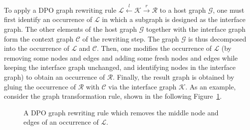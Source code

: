 To apply a DPO graph rewriting rule $\mathcal{L} \overset{l}{\leftarrow} \mathcal{K} \overset{r}{\rightarrow} \mathcal{R}$ to a host graph $\mathcal{G}$, one must first identify an occurrence of $\mathcal{L}$ in which a subgraph is designed as the interface graph. The other elements of the host graph $\mathcal{G}$ together with the interface graph form the context graph $\mathcal{C}$ of the rewriting step.
The graph $\mathcal{G}$ is thus decomposed into the occurrence of $\mathcal{L}$ and $\mathcal{C}$. 
Then, one modifies the occurrence of $\mathcal{L}$ (by removing some nodes and edges and adding some fresh nodes and edges while keeping the interface graph unchanged, and identifying nodes in the interface graph)
to obtain an occurrence of $\mathcal{R}$. Finally, the result graph is obtained by gluing the occurrence of $\mathcal{R}$ with $\mathcal{C}$ via the interface graph $\mathcal{K}$.
As an example, 
consider the graph transformation rule, shown in the following Figure~\ref{fig:intro:graph_transformation_rule_dpo_sssssfggaaadww}.
  \begin{figure}[H]
    \centering
    \caption{A DPO graph rewriting rule which removes the middle node and edges of an occurrence of $\mathcal{L}$.}
    \label{fig:intro:graph_transformation_rule_dpo_sssssfggaaadww}
\end{figure}
